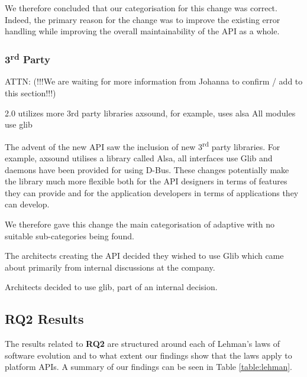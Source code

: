 \documentclass{sig-alternate}
\begin{document}
We therefore concluded that our categorisation for this change was correct. Indeed, the primary reason for the change was to improve the existing error handling while improving the overall maintainability of the API as a whole. 

\subsubsection{3\textsuperscript{rd} Party}
ATTN: (!!!We are waiting for more information from Johanna to confirm / add to this section!!!)

2.0 utilizes more 3rd party libraries
axsound, for example, uses alsa
All modules use glib

The advent of the new API saw the inclusion of new 3\textsuperscript{rd} party libraries. For example, axsound utilises a library called Alsa, all interfaces use Glib and daemons have been provided for using D-Bus. These changes potentially make the library much more flexible both for the API designers in terms of features they can provide and for the application developers in terms of applications they can develop.

We therefore gave this change the main categorisation of adaptive with no suitable sub-categories being found.


The architects creating the API decided they wished to use Glib which came about primarily from internal discussions at the company.

Architects decided to use glib, part of an internal decision. 


\subsection{RQ2 Results} \label{results_rq2}
The results related to \textbf{RQ2} are structured around each of Lehman's laws of software evolution \cite{lehman1980programs} and to what extent our findings show that the laws apply to platform APIs. A summary of our findings can be seen in Table \ref{table:lehman}. 
\end{document}
